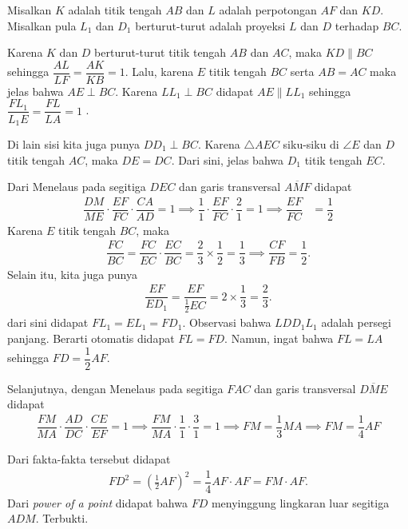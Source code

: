     Misalkan $K$ adalah titik tengah $AB$ dan $L$ adalah perpotongan $AF$ dan $KD$. Misalkan pula $L_1$ dan $D_1$ berturut-turut adalah proyeksi $L$ dan $D$ terhadap $BC$.

    Karena $K$ dan $D$ berturut-turut titik tengah $AB$ dan $AC$, maka $KD \parallel BC$ sehingga $\dfrac{AL}{LF} = \dfrac{AK}{KB} = 1$. Lalu, karena $E$ titik tengah $BC$ serta $AB=AC$ maka jelas bahwa $AE \perp BC$. Karena $LL_1 \perp BC$ didapat $AE \parallel LL_1$ sehingga $\dfrac{FL_1}{L_1E} = \dfrac{FL}{LA} = 1$ .

    Di lain sisi kita juga punya $DD_1 \perp BC$. Karena $\triangle AEC$ siku-siku di $\angle E$ dan $D$ titik tengah $AC$, maka $DE=DC$. Dari sini, jelas bahwa $D_1$ titik tengah $EC$.

    Dari Menelaus pada segitiga $DEC$ dan garis transversal $\overline{AMF}$ didapat
    \begin{align*}
        \dfrac{DM}{ME}\cdot \dfrac{EF}{FC} \cdot \dfrac{CA}{AD} = 1 \implies
        \dfrac{1}{1}\cdot \dfrac{EF}{FC} \cdot \dfrac{2}{1} = 1 \implies
        \dfrac{EF}{FC} &= \dfrac{1}{2}
    \end{align*}
    Karena $E$ titik tengah $BC$, maka 
    \begin{align*}
        \dfrac{FC}{BC} = \dfrac{FC}{EC} \cdot \dfrac{EC}{BC} = \dfrac{2}{3} \times \dfrac{1}{2} = \dfrac{1}{3} \implies \dfrac{CF}{FB} = \dfrac{1}{2}.
    \end{align*}
    Selain itu, kita juga punya
    \begin{align*}
        \dfrac{EF}{ED_1} = \dfrac{EF}{\frac{1}{2}EC} = 2 \times \dfrac{1}{3} = \dfrac{2}{3}.
    \end{align*}
    dari sini didapat $FL_1 = EL_1 = FD_1$. Observasi bahwa $LDD_1L_1$ adalah persegi panjang. Berarti otomatis didapat $FL = FD$. Namun, ingat bahwa $FL = LA$ sehingga $FD = \dfrac{1}{2}AF$.

    Selanjutnya, dengan Menelaus pada segitiga $FAC$ dan garis transversal $\overline{DME}$ didapat
    \begin{align*}
        \dfrac{FM}{MA} \cdot \dfrac{AD}{DC} \cdot \dfrac{CE}{EF} = 1 \implies \dfrac{FM}{MA} \cdot \dfrac{1}{1} \cdot \dfrac{3}{1} = 1 \implies FM = \dfrac{1}{3} MA \implies FM = \dfrac{1}{4} AF
    \end{align*}

    Dari fakta-fakta tersebut didapat
    \begin{align*}
        FD^2 = \left(\frac{1}{2}AF\right)^2 = \dfrac{1}{4} AF \cdot AF = FM \cdot AF.
    \end{align*}
    Dari \textit{power of a point} didapat bahwa $FD$ menyinggung lingkaran luar segitiga $ADM$. Terbukti.

